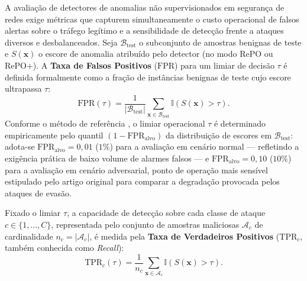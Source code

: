 \documentclass[conference]{IEEEtran}
\begin{document}
A avaliação de detectores de anomalias não supervisionados em segurança de redes exige métricas que capturem simultaneamente o custo operacional de falsos alertas sobre o tráfego legítimo e a sensibilidade de detecção frente a ataques diversos e desbalanceados.
Seja $\mathcal{B}_{\text{test}}$ o subconjunto de amostras benignas de teste e $S(\mathbf{x})$ o escore de anomalia atribuído pelo detector (no modo RePO ou RePO+).
A \textbf{Taxa de Falsos Positivos} ($\text{FPR}$) para um limiar de decisão $\tau$ é definida formalmente como a fração de instâncias benignas de teste cujo escore ultrapassa $\tau$:
\begin{equation}
\text{FPR}(\tau) = \frac{1}{|\mathcal{B}_{\text{test}}|} \sum_{\mathbf{x} \in \mathcal{B}_{\text{test}}} \mathbb{I}\!\left(S(\mathbf{x}) > \tau\right).
\label{eq:fpr_metric}
\end{equation}
Conforme o método de referência \cite{hashemi2020}, o limiar operacional $\tau$ é determinado empiricamente pelo quantil $(1 - \text{FPR}_{\text{alvo}})$ da distribuição de escores em $\mathcal{B}_{\text{test}}$: adota-se $\text{FPR}_{\text{alvo}} = 0{,}01$ ($1\%$) para a avaliação em cenário normal — refletindo a exigência prática de baixo volume de alarmes falsos — e $\text{FPR}_{\text{alvo}} = 0{,}10$ ($10\%$) para a avaliação em cenário adversarial, ponto de operação mais sensível estipulado pelo artigo original para comparar a degradação provocada pelos ataques de evasão.

Fixado o limiar $\tau$, a capacidade de detecção sobre cada classe de ataque $c \in \{1, \dots, C\}$, representada pelo conjunto de amostras maliciosas $\mathcal{A}_c$ de cardinalidade $n_c = |\mathcal{A}_c|$, é medida pela \textbf{Taxa de Verdadeiros Positivos} ($\text{TPR}_c$, também conhecida como \textit{Recall}):
\begin{equation}
\text{TPR}_c(\tau) = \frac{1}{n_c} \sum_{\mathbf{x} \in \mathcal{A}_c} \mathbb{I}\!\left(S(\mathbf{x}) > \tau\right).
\label{eq:tpr_class}
\end{equation}
\end{document}
